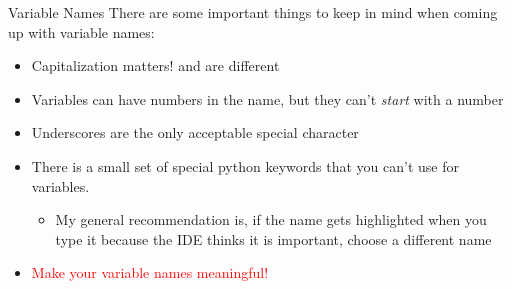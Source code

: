 \documentclass[pdf, aspectratio=169, 12pt]{beamer}
\begin{document}
\begin{frame}{Variable Names}
	There are some important things to keep in mind when coming up with variable names:
	\begin{itemize}
		\item Capitalization matters!  and  are different
		\item Variables can have numbers in the name, but they can't \emph{start} with a number
		\item Underscores are the only acceptable special character
		\item There is a small set of special python keywords that you can't use for variables.
			\begin{itemize}
				\item My general recommendation is, if the name gets highlighted when you type it because the IDE thinks it is important, choose a different name
			\end{itemize}
		\item \textcolor{Red}{Make your variable names meaningful!}
	\end{itemize}
\end{frame}

\end{document}
